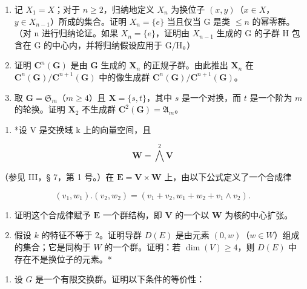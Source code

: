 \begin{enumerate}
\def\labelenumi{(\alph{enumi})}
\item
  记 \(X_{1} = X\)；对于 \(n \geqslant 2\)，归纳地定义 \(X_{n}\) 为换位子 \((x, y)\)（\(x \in X\)，\(y \in X_{n-1}\)）所成的集合。证明 \(X_{n} = \{e\}\) 当且仅当 G 是类 \(\leqslant n\) 的幂零群。（对 n 进行归纳论证。如果 \(X_{n} = \{e\}\)，证明由 \(X_{n-1}\) 生成的 G 的子群 H 包含在 G 的中心内，并将归纳假设应用于 G/H。）
\item
  证明 \(\mathbf{C}^n (\mathbf{G})\) 是由 \(\mathbf{G}\) 生成的 \(\mathbf{X}_n\) 的正规子群。由此推出 \(\mathbf{X}_n\) 在 \(\mathbf{C}^n (\mathbf{G}) / \mathbf{C}^{n + 1}(\mathbf{G})\) 中的像生成群 \(\mathbf{C}^n (\mathbf{G}) / \mathbf{C}^{n + 1}(\mathbf{G})\)。
\item
  取 \(\mathbf{G} = \mathfrak{S}_m\)（\(m \geqslant 4\)）且 \(\mathbf{X} = \{s, t\}\)，其中 \(s\) 是一个对换，而 \(t\) 是一个阶为 \(m\) 的轮换。证明 \(\mathbf{X}_2\) 不生成群 \(\mathbf{C}^2(\mathbf{G}) = \mathfrak{A}_m\)。
\end{enumerate}

\begin{enumerate}
\def\labelenumi{\arabic{enumi}。}
\setcounter{enumi}{15}
\tightlist
\item
  *设 V 是交换域 k 上的向量空间，且
\end{enumerate}

\[
\mathbf {W} = \bigwedge^ {2} \mathbf {V}
\]

（参见 III，§ 7，第 1 号。）在 \(\mathbf{E} = \mathbf{V} \times \mathbf{W}\) 上，由以下公式定义了一个合成律

\[
(v _ {1}, w _ {1}). (v _ {2}, w _ {2}) = (v _ {1} + v _ {2}, w _ {1} + w _ {2} + v _ {1} \wedge v _ {2}).
\]

\begin{enumerate}
\def\labelenumi{(\alph{enumi})}
\item
  证明这个合成律赋予 \(\mathbf{E}\) 一个群结构，即 \(\mathbf{V}\) 的一个以 \(\mathbf{W}\) 为核的中心扩张。
\item
  假设 \(k\) 的特征不等于 2。证明导群 \(D(E)\) 是由元素 \((0, w)\)（\(w \in W\)）组成的集合；它是同构于 \(W\) 的一个群。证明：若 \(\dim(V) \geqslant 4\)，则 \(D(E)\) 中存在不是换位子的元素。*
\end{enumerate}

\begin{enumerate}
\def\labelenumi{\arabic{enumi}。}
\setcounter{enumi}{16}
\tightlist
\item
  设 \(G\) 是一个有限交换群。证明以下条件的等价性：
\end{enumerate}

